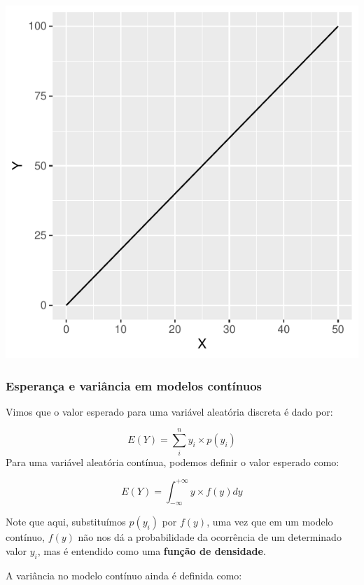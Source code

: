 \documentclass[
]{book}
\begin{document}
\begin{center}\includegraphics{probest-cambientais_files/figure-latex/unnamed-chunk-211-1} \end{center}

\hypertarget{esperanuxe7a-e-variuxe2ncia-em-modelos-contuxednuos}{%
\subsubsection*{Esperança e variância em modelos contínuos}\label{esperanuxe7a-e-variuxe2ncia-em-modelos-contuxednuos}}

Vimos que o valor esperado para uma variável aleatória discreta é dado por:

\[E(Y) = \sum_i^n y_i \times p(y_i)\]
Para uma variável aleatória contínua, podemos definir o valor esperado como:

\[E(Y) = \int_{-\infty}^{+\infty}y \times f(y) dy\]

Note que aqui, substituímos \(p(y_i)\) por \(f(y)\), uma vez que em um modelo contínuo, \(f(y)\) não nos dá a probabilidade da ocorrência de um determinado valor \(y_i\), mas é entendido como uma \textbf{função de densidade}.

A variância no modelo contínuo ainda é definida como:
\end{document}
